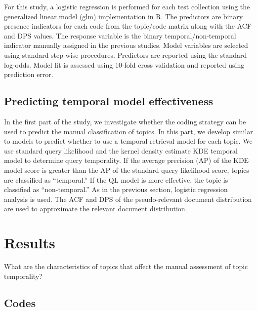 \documentclass{sig-alternate}
\begin{document}
For this study, a logistic regression is performed for each test collection using the generalized linear model (glm) implementation in R. The predictors are binary presence indicators for each code from the topic/code matrix along with the ACF and DPS values. The response variable is the binary temporal/non-temporal indicator manually assigned in the previous studies. Model variables are selected using standard step-wise procedures. Predictors are reported using the standard log-odds. Model fit is assessed using 10-fold cross validation and reported using prediction error.

\subsection{Predicting temporal model effectiveness}
In the first part of the study, we investigate whether the coding strategy can be used to predict the manual classification of topics. In this part, we develop similar to models to predict whether to use a temporal retrieval model for each topic. We use standard query likelihood \cite{XXX} and the kernel density estimate {KDE} temporal model \cite{Efron2014} to determine query temporality. If the average precision (AP) of the KDE model score is greater than the AP of the standard query likelihood score, topics are classified as ``temporal.''  If the QL model is more effective, the topic is classified as ``non-temporal.'' As in the previous section, logistic regression analysis is used. The ACF and DPS of the pseudo-relevant document distribution are used to approximate the relevant document distribution.

\section{Results}

What are the characteristics of topics that affect the manual assessment of topic temporality? 

\subsection{Codes}
\end{document}
